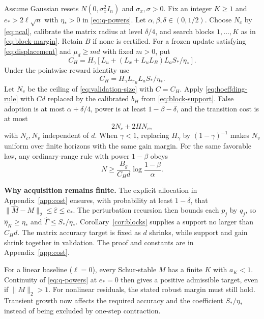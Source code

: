 \documentclass[twocolumn,nameyear]{autart}
\begin{document}
\begin{thm}\label{thm:cost}
Assume Gaussian resets $N(0,\sigma_x^2I_n)$ and $\sigma_x,\sigma>0$.
Fix an integer $K\ge1$ and $e_*>2\ell\sqrt n$ with $\eta_*>0$ in
\eqref{eq:q-powers}. Let $\alpha,\beta,\delta\in(0,1/2)$.
Choose $N_c$ by \eqref{eq:ncal}, calibrate the matrix radius at
level $\delta/4$, and search blocks $1,\ldots,K$ as in
\eqref{eq:block-margin}. Retain $B$ if none is certified.
For a frozen update satisfying \eqref{eq:displacement} and
$\mu_d\ge md$ with fixed $m>0$, put
\begin{equation}\label{eq:cost-C}
 C_H=H_\gamma[L_u+(L_x+L_uL_B)L_aS_*/\eta_*].
\end{equation}
Under the pointwise reward identity use
\[
 C_H=H_\gamma L_{r_B}L_aS_*/\eta_*.
\]
Let $N_v$ be the ceiling of \eqref{eq:validation-size} with $C=C_H$.
Apply \eqref{eq:hoeffding-rule} with $Cd$ replaced by the calibrated
$b_H$ from \eqref{eq:block-support}.
False adoption is at most $\alpha+\delta/4$, power is at least
$1-\beta-\delta$, and the transition cost is at most
\begin{equation}\label{eq:total-cost}
 2N_c+2HN_v,
\end{equation}
with $N_c,N_v$ independent of $d$. When $\gamma<1$, replacing
$H_\gamma$ by $(1-\gamma)^{-1}$ makes $N_v$ uniform over finite
horizons with the same gain margin. For the same favorable law, any
ordinary-range rule with power $1-\beta$ obeys
\begin{equation}\label{eq:cost-lower}
 N\ge\frac{B_g}{C_Hd}\log\frac{1-\beta}{\alpha}.
\end{equation}
\end{thm}

\medskip\noindent\textbf{Why acquisition remains finite.}
The explicit allocation in Appendix~\ref{app:cost} ensures, with
probability at least $1-\delta$, that
$\|\widehat M-M\|_2\le\widehat\varepsilon\le e_*$.
The perturbation recursion then bounds each $p_j$ by $q_j$, so
$\widehat\eta_K\ge\eta_*$ and $\widehat\Gamma\le S_*/\eta_*$.
Corollary~\ref{cor:blocks} supplies a support no larger than $C_Hd$.
The matrix accuracy target is fixed as $d$ shrinks, while support and
gain shrink together in validation. The proof and constants are in
Appendix~\ref{app:cost}.

For a linear baseline ($\ell=0$), every Schur-stable $M$ has a finite
$K$ with $a_K<1$. Continuity of \eqref{eq:q-powers} at $e_*=0$
then gives a positive admissible target, even if $\|M\|_2>1$.
For nonlinear residuals, the stated robust margin must still hold.
Transient growth now affects the required accuracy and the coefficient
$S_*/\eta_*$ instead of being excluded by one-step contraction.
\end{document}
